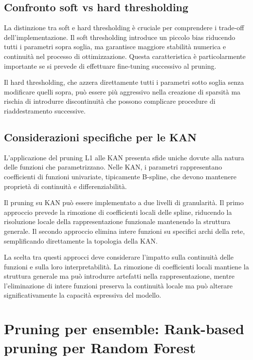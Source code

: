 \documentclass[a4paper,12pt]{report}
\begin{document}
	\subsection{Confronto soft vs hard thresholding}
	La distinzione tra soft e hard thresholding è cruciale per comprendere i trade-off dell'implementazione. Il soft thresholding introduce un piccolo bias riducendo tutti i parametri sopra soglia, ma garantisce maggiore stabilità numerica e continuità nel processo di ottimizzazione. Questa caratteristica è particolarmente importante se si prevede di effettuare fine-tuning successivo al pruning.
	
	Il hard thresholding, che azzera direttamente tutti i parametri sotto soglia senza modificare quelli sopra, può essere più aggressivo nella creazione di sparsità ma rischia di introdurre discontinuità che possono complicare procedure di riaddestramento successive.
	
	\subsection{Considerazioni specifiche per le KAN}
	L'applicazione del pruning L1 alle KAN presenta sfide uniche dovute alla natura delle funzioni che parametrizzano. Nelle KAN, i parametri rappresentano coefficienti di funzioni univariate, tipicamente B-spline, che devono mantenere proprietà di continuità e differenziabilità.
	
	Il pruning su KAN può essere implementato a due livelli di granularità. Il primo approccio prevede la rimozione di coefficienti locali delle spline, riducendo la risoluzione locale della rappresentazione funzionale mantenendo la struttura generale. Il secondo approccio elimina intere funzioni su specifici archi della rete, semplificando direttamente la topologia della KAN.
	
	La scelta tra questi approcci deve considerare l'impatto sulla continuità delle funzioni e sulla loro interpretabilità. La rimozione di coefficienti locali mantiene la struttura generale ma può introdurre artefatti nella rappresentazione, mentre l'eliminazione di intere funzioni preserva la continuità locale ma può alterare significativamente la capacità espressiva del modello.
	
	\section{Pruning per ensemble: Rank-based pruning per Random Forest}
	
\end{document}
